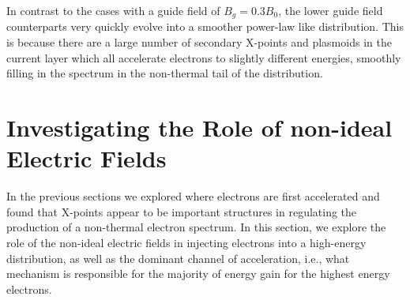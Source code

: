 In contrast to the cases with a guide field of $B_{g}=0.3B_{0}$, the lower guide field counterparts very quickly evolve into a smoother power-law like distribution.  This is because there are a large number of secondary X-points and plasmoids in the current layer which all accelerate electrons to slightly different energies, smoothly filling in the spectrum in the non-thermal tail of the distribution.


\section{Investigating the Role of non-ideal Electric Fields}\label{E_comps}
In the previous sections we explored where electrons are first accelerated and found that X-points appear to be important structures in regulating the production of a non-thermal electron spectrum.  In this section, we explore the role of the non-ideal electric fields in injecting electrons into a high-energy distribution, as well as the dominant channel of acceleration, i.e., what mechanism is responsible for the majority of energy gain for the highest energy electrons. 


